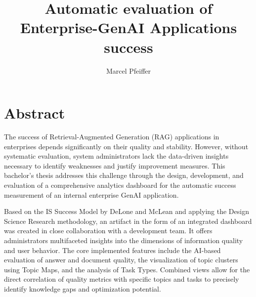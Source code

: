 \documentclass[
	english,
	ruledheaders=section,%
	class=report,%
	thesis={type=bachelor},%
	accentcolor=1b,%
	custommargins=true,%
	marginpar=false,%
	parskip=half-,%
	fontsize=11pt,%
	DIV=14,
]{tudapub}
\begin{document}


\title{Automatic evaluation of Enterprise-GenAI Applications success}

\author[M. Pfeiffer]{Marcel Pfeiffer}%


\submissiondate{\today}
\examdate{\today}


\maketitle

\affidavit


\chapter*{Abstract}
The success of Retrieval-Augmented Generation (RAG) applications in enterprises depends significantly on their quality and stability. However, without systematic evaluation, system administrators lack the data-driven insights necessary to identify weaknesses and justify improvement measures. This bachelor's thesis addresses this challenge through the design, development, and evaluation of a comprehensive analytics dashboard for the automatic success measurement of an internal enterprise GenAI application.

Based on the IS Success Model by DeLone and McLean and applying the Design Science Research methodology, an artifact in the form of an integrated dashboard was created in close collaboration with a development team. It offers administrators multifaceted insights into the dimensions of information quality and user behavior. The core implemented features include the AI-based evaluation of answer and document quality, the visualization of topic clusters using Topic Maps, and the analysis of Task Types. Combined views allow for the direct correlation of quality metrics with specific topics and tasks to precisely identify knowledge gaps and optimization potential.
\end{document}

